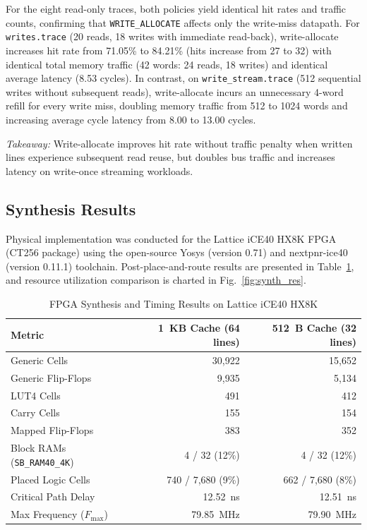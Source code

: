 \documentclass[conference]{IEEEtran}
\begin{document}
For the eight read-only traces, both policies yield identical hit rates and traffic counts, confirming that \texttt{WRITE\_ALLOCATE} affects only the write-miss datapath. For \texttt{writes.trace} (20 reads, 18 writes with immediate read-back), write-allocate increases hit rate from 71.05\% to 84.21\% (hits increase from 27 to 32) with identical total memory traffic (42 words: 24 reads, 18 writes) and identical average latency (8.53 cycles). In contrast, on \texttt{write\_stream.trace} (512 sequential writes without subsequent reads), write-allocate incurs an unnecessary 4-word refill for every write miss, doubling memory traffic from 512 to 1024 words and increasing average cycle latency from 8.00 to 13.00 cycles.

\textit{Takeaway:} Write-allocate improves hit rate without traffic penalty when written lines experience subsequent read reuse, but doubles bus traffic and increases latency on write-once streaming workloads.

\subsection{Synthesis Results}
Physical implementation was conducted for the Lattice iCE40 HX8K FPGA (CT256 package) using the open-source Yosys (version 0.71) and nextpnr-ice40 (version 0.11.1) toolchain. Post-place-and-route results are presented in Table~\ref{tab:synthesis}, and resource utilization comparison is charted in Fig.~\ref{fig:synth_res}.

\begin{table}[htbp]
\caption{FPGA Synthesis and Timing Results on Lattice iCE40 HX8K}
\label{tab:synthesis}
\centering
\begin{tabular}{lrr}
\toprule
\textbf{Metric} & \textbf{1~KB Cache (64 lines)} & \textbf{512~B Cache (32 lines)} \\
\midrule
Generic Cells & 30,922 & 15,652 \\
Generic Flip-Flops & 9,935 & 5,134 \\
LUT4 Cells & 491 & 412 \\
Carry Cells & 155 & 154 \\
Mapped Flip-Flops & 383 & 352 \\
Block RAMs (\texttt{SB\_RAM40\_4K}) & 4 / 32 (12\%) & 4 / 32 (12\%) \\
Placed Logic Cells & 740 / 7,680 (9\%) & 662 / 7,680 (8\%) \\
Critical Path Delay & 12.52~ns & 12.51~ns \\
Max Frequency ($F_{\max}$) & 79.85~MHz & 79.90~MHz \\
\bottomrule
\end{tabular}
\end{table}
\end{document}
